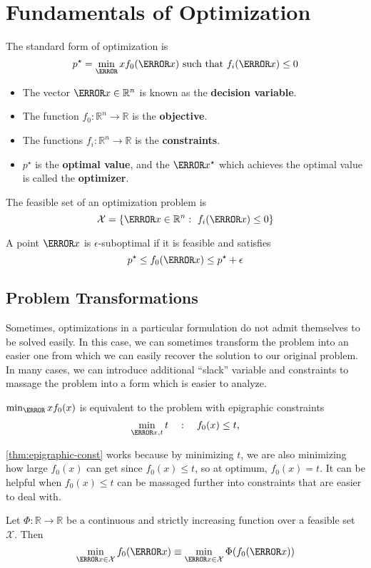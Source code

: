 \section{Fundamentals of Optimization}
\begin{definition}
	The standard form of optimization is \[
		p^\star = \min_\V{x} f_0(\V{x}) \text{ such that } f_i(\V{x}) \leq 0
	\]
	\label{defn:optimization}
\end{definition}
\begin{itemize}
	\item The vector $\V{x}\in\mathbb{R}^n$ is known as the \textbf{decision variable}.
	\item The function $f_0:\mathbb{R}^n\to\mathbb{R}$ is the \textbf{objective}.
	\item The functions $f_i:\mathbb{R}^n\to\mathbb{R}$ is the \textbf{constraints}.
	\item $p^\star$ is the \textbf{optimal value}, and the $\V{x}^\star$ which achieves the optimal value is called the \textbf{optimizer}.
\end{itemize}
\begin{definition}
	The feasible set of an  optimization problem is \[
		\mathcal{X} = \{\V{x}\in\mathbb{R}^n:\ f_i(\V{x}) \leq 0 \}
	\]
	\label{defn:feasible-set}
\end{definition}
\begin{definition}
	A point $\V{x}$ is $\epsilon$-suboptimal if it is feasible and satisfies \[
		p^\star \leq f_0(\V{x}) \leq p^\star + \epsilon
	\]
	\label{defn:suboptimal}
\end{definition}
\subsection{Problem Transformations}
Sometimes, optimizations in a particular formulation do not admit themselves to be solved easily.
In this case, we can sometimes transform the problem into an easier one from which we can easily recover the solution to our original problem.
In many cases, we can introduce additional ``slack'' variable and constraints to massage the problem into a form which is easier to analyze.
\begin{theorem}
	$\min_\V{x} f_0(x)$ is equivalent to the problem with epigraphic constraints
	\[
		\min_{\V{x}, t} t \quad : \quad f_0(x) \leq t,
	\]
	\label{thm:epigraphic-const}
\end{theorem}
\cref{thm:epigraphic-const} works because by minimizing $t$, we are also minimizing how large $f_0(x)$ can get since $f_0(x) \leq t$, so at optimum, $f_0(x) = t$.
It can be helpful when $f_0(x) \leq t$ can be massaged further into constraints that are easier to deal with.
\begin{theorem}
	Let $\Phi:\mathbb{R}\to\mathbb{R}$ be a continuous and strictly increasing function over a feasible set $\mathcal{X}$. Then \[
		\min_{\V{x}\in\mathcal{X}}f_0(\V{x}) \equiv \min_{\V{x}\in\mathcal{X}} \Phi(f_0(\V{x}))
	\]
	\label{thm:monotone-increasing}
\end{theorem}
